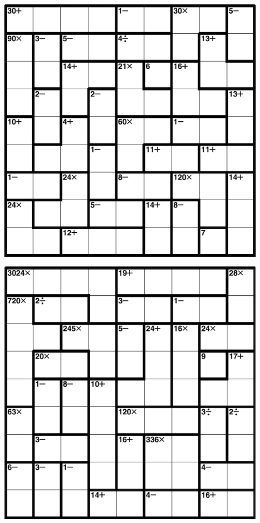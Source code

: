 
\includegraphics[scale=1]{Gambar/Lampiran/9x9_3.png}

\includegraphics[scale=1]{Gambar/Lampiran/9x9_4.png}

\onecolumn